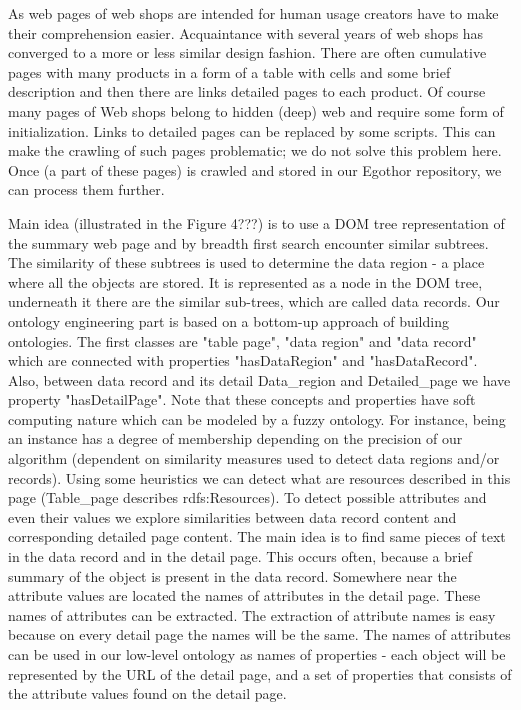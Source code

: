 \documentclass{sig-alternate}
\begin{document}
As web pages of web shops are intended for human usage creators have to make their comprehension easier. Acquaintance with several years of web shops has converged to a more or less similar design fashion. There are often cumulative pages with many products in a form of a table with cells and some brief description and then there are links detailed pages to each product. Of course many pages of Web shops belong to hidden (deep) web and require some form of initialization. Links to detailed pages can be replaced by some scripts. This can make the crawling of such pages problematic; we do not solve this problem here. Once (a part of these pages) is crawled and stored in our Egothor repository, we can process them further. 

Main idea (illustrated in the Figure 4???) is to use a DOM tree representation of the summary web page and by breadth first search encounter similar subtrees. The similarity of these subtrees is used to determine the data region - a place where all the objects are stored. It is represented as a node in the DOM tree, underneath it there are the similar sub-trees, which are called data records. Our ontology engineering part is based on a bottom-up approach of building ontologies. The first classes are "table page", "data region" and "data record" which are connected with properties "hasDataRegion" and "hasDataRecord". Also, between data record and its detail Data\_region and Detailed\_page we have property "hasDetailPage". Note that these concepts and properties have soft computing nature which can be modeled by a fuzzy ontology. For instance, being an instance has a degree of membership depending on the precision of our algorithm (dependent on similarity measures used to detect data regions and/or records). Using some heuristics we can detect what are resources described in this page (Table\_page describes rdfs:Resources). To detect possible attributes and even their values we explore similarities between data record content and corresponding detailed page content. The main idea is to find same pieces of text in the data record and in the detail page. This occurs often, because a brief summary of the object is present in the data record. Somewhere near the attribute values are located the names of attributes in the detail page. These names of attributes can be extracted. The extraction of attribute names is easy because on every detail page the names will be the same.  The names of attributes can be used in our low-level ontology as names of properties - each object will be represented by the URL of the detail page, and a set of properties that consists of the attribute values found on the detail page.
\end{document}
